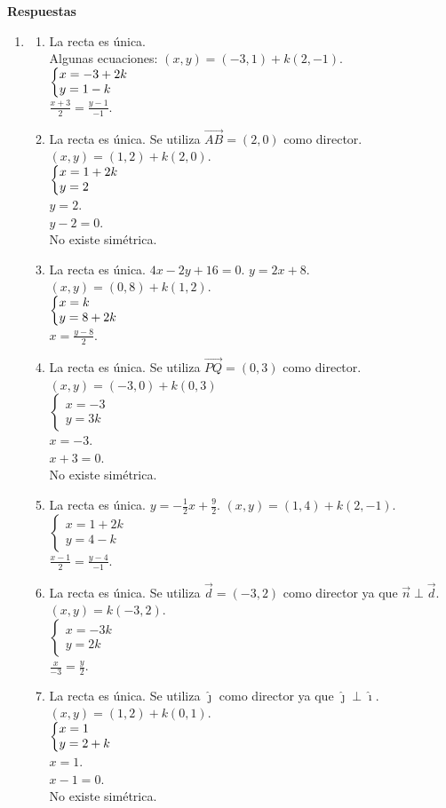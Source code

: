 \documentclass[a4paper]{article}
\newcommand{\exercise}{\item}
\newcommand{\SEL}[1]{\left\{\begin{matrix} #1 \end{matrix}\right.}
\begin{document}
 \textbf{Respuestas}\begin{enumerate}\exercise\begin{enumerate} [label=(\alph*)]		\item La recta es única. \\ Algunas ecuaciones: $(x,y)=(-3,1)+k(2,-1)$. \\ $\SEL{ x=-3+2k \\ y=1-k \hfill }$ \\ $\displaystyle{\frac{x+3}{2}=\frac{y-1}{-1}}$.
		\item La recta es única. Se utiliza $\overrightarrow{AB}=(2,0)$ como director. \\ $(x,y)=(1,2)+k(2,0)$. \\ $\SEL{ x=1+2k \\ y=2 \hfill }$ \\ $y=2$.\\ $y-2=0$. \\ No existe simétrica.
		\item La recta es única. $4x-2y+16=0$. $y=2x+8$. $(x,y)=(0,8)+k(1,2)$. \\ $\SEL{ x=k \hfill \\ y=8+2k }$ \\ $\displaystyle{x=\frac{y-8}{2}}$.
		\item La recta es única. Se utiliza $\overrightarrow{PQ}=(0,3)$ como director. \\ $(x,y)=(-3,0)+k(0,3)$  \\ $\SEL{ x=-3 \\ y=3k }$ \\ $x=-3$. \\ $x+3=0$. \\ No existe simétrica.
		\item La recta es única. $y=-\frac{1}{2}x+\frac{9}{2}$. $(x,y)=(1,4)+k(2,-1)$. \\ $\SEL{ x=1+2k \\ y=4-k }$ \\ $\displaystyle{\frac{x-1}{2}=\frac{y-4}{-1}}$.
		\item La recta es única. Se utiliza $\vec{d}=(-3,2)$ como director ya que $\vec{n} \perp \vec{d}$. \\ $(x,y)=k(-3,2)$. \\ $\SEL{ x=-3k \\ y=2k }$ \\ $\displaystyle{\frac{x}{-3}=\frac{y}{2}}$.
		\item La recta es única. Se utiliza $\hat{\jmath}$ como director ya que $\hat{\jmath} \perp \hat{\imath}$. \\ $(x,y)=(1,2)+k(0,1)$. \\ $\SEL{ x=1 \hfill\\ y=2+k }$ \\ $x=1$. \\ $x-1=0$. \\ No existe simétrica.

\end{enumerate}
\end{enumerate}
\end{document}
